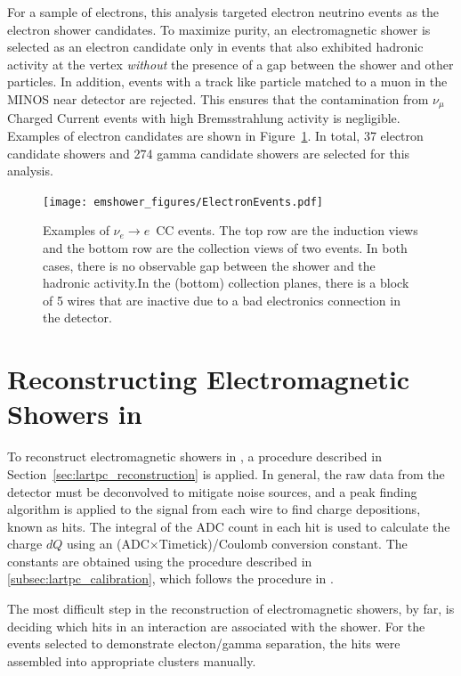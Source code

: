 For a sample of electrons, this analysis targeted electron neutrino events as the electron shower candidates.  To maximize purity, an electromagnetic shower is selected as an electron candidate only in events that also exhibited hadronic activity at the vertex {\em without} the presence of a gap between the shower and other particles.  In addition, events with a track like particle matched to a muon in the MINOS near detector are rejected.  This ensures that the contamination from $\nu_\mu$ Charged Current events with high Bremsstrahlung activity is negligible.  Examples of electron candidates are shown in Figure~\ref{fig:electrons}. In total, 37 electron candidate showers and 274 gamma candidate showers are selected for this analysis.



\begin{figure}[ht]
\centering
\texttt{[image: emshower\_figures/ElectronEvents.pdf]}
\caption{\label{fig:electrons} Examples of $\nu_e \rightarrow e$~CC events.  The top row are the induction views and the bottom row are the collection views of two events. In both cases, there is no observable gap between the shower and the hadronic activity.In the (bottom) collection planes, there is a block of 5 wires that are inactive due to a bad electronics connection in the detector.}
\end{figure}


\section{Reconstructing Electromagnetic Showers in \lartpcs}

To reconstruct electromagnetic showers in \lartpcs, a procedure described in Section~\ref{sec:lartpc_reconstruction} is applied.  In general, the raw data from the detector must be deconvolved to mitigate noise sources, and a peak finding algorithm is applied to the signal from each wire to find charge depositions, known as hits. The integral of the ADC count in each hit is used to calculate the charge $dQ$ using an (ADC$\times$Timetick)/Coulomb conversion constant.  The constants are obtained using the procedure described in \ref{subsec:lartpc_calibration}, which follows the procedure in \cite{TGMuon}.

The most difficult step in the reconstruction of electromagnetic showers, by far, is deciding which hits in an interaction are associated with the shower. For the events selected to demonstrate electon/gamma separation, the hits were assembled into appropriate clusters manually.

